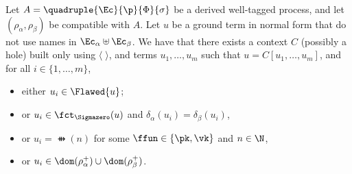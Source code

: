 \begin{lemma}
  \label{lem : deductibily of fct_C}
 {Let $A = \quadruple{\Ec}{\p}{\Phi}{\sigma}$ be a derived well-tagged process, and let $(\rho_\alpha, \rho_\beta)$ be compatible with $A$.} Let $u$ be a ground term in normal form that do not use names in $\Ec_\alpha \uplus \Ec_\beta$. We have that there exists a context $C$ (possibly a hole) built only using $\langle\; \rangle$, and terms $u_1, \ldots, u_m$ such that $u = C[u_1, \ldots, u_m]$, and for all $i \in \{1, \ldots, m\}$,
  \begin{itemize}
  \item either $u_i \in \Flawed{u}$;
  \item or $u_i \in \fct_{\Sigmazero}(u)$ and $\delta_\alpha(u_i) =
   \delta_\beta(u_i)$,
  \item or $u_i = \ffun(n)$ for some $\ffun \in \{\pk, \vk\}$ and $n \in \N$,
  \item or $u_i \in \dom(\rho^+_\alpha) \cup \dom(\rho^+_\beta)$.
  \end{itemize}
\end{lemma}

